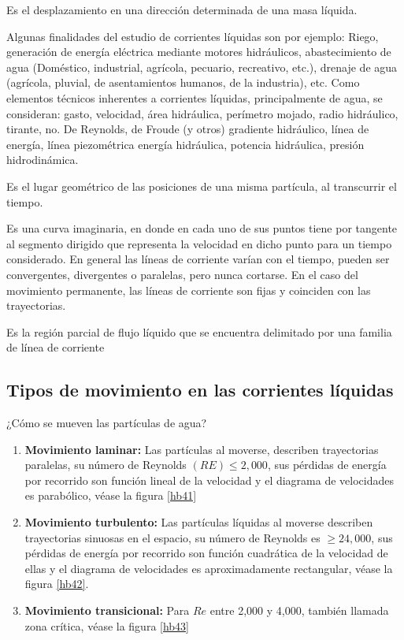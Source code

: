 \begin{definition}
Es el desplazamiento en una dirección determinada de una masa líquida.
\end{definition}
Algunas finalidades del estudio de corrientes líquidas son por ejemplo: Riego, generación de energía eléctrica mediante motores hidráulicos, abastecimiento de agua (Doméstico, industrial, agrícola, pecuario, recreativo, etc.), drenaje de agua (agrícola, pluvial, de asentamientos humanos, de la industria), etc.
Como elementos técnicos inherentes a corrientes líquidas, principalmente de agua, se consideran: gasto, velocidad, área hidráulica, perímetro mojado, radio hidráulico, tirante, no. De Reynolds, de Froude (y otros) gradiente hidráulico, línea de energía, línea piezométrica energía hidráulica, potencia hidráulica, presión hidrodinámica.
\begin{definition}[Trayectoria]
    Es el lugar geométrico de las posiciones de una misma partícula, al transcurrir el tiempo.
\end{definition}
\begin{definition}
    Es una curva imaginaria, en donde en cada uno de sus puntos tiene por tangente al segmento dirigido que representa la velocidad en dicho punto para un tiempo considerado. En general las líneas de corriente varían con el tiempo, pueden ser convergentes, divergentes o paralelas, pero nunca cortarse. En el caso del movimiento permanente, las líneas de corriente son fijas y coinciden con las trayectorias.
\end{definition}

\begin{definition}
    Es la región parcial de flujo líquido que se encuentra delimitado por una familia de línea de corriente
\end{definition}

\subsection{Tipos de movimiento en las corrientes líquidas}

¿Cómo se mueven las partículas de agua?

\begin{enumerate}
    \item \textbf{Movimiento laminar:} Las partículas al moverse, describen trayectorias paralelas, su número de Reynolds $(RE)\leq 2,000$, sus pérdidas de energía por recorrido son función lineal de la velocidad y el diagrama de velocidades es parabólico, véase la figura \ref{hb41} 
    \item \textbf{Movimiento turbulento:} Las partículas líquidas al moverse describen trayectorias sinuosas en el espacio, su número de Reynolds es $\geq 24,000$, sus pérdidas de energía por recorrido son función cuadrática de la velocidad de ellas y el diagrama de velocidades es aproximadamente rectangular, véase la figura \ref{hb42}.
    \item \textbf{Movimiento transicional:} Para $Re$ entre 2,000 y 4,000, también llamada zona crítica, véase la figura \ref{hb43} 
\end{enumerate}


